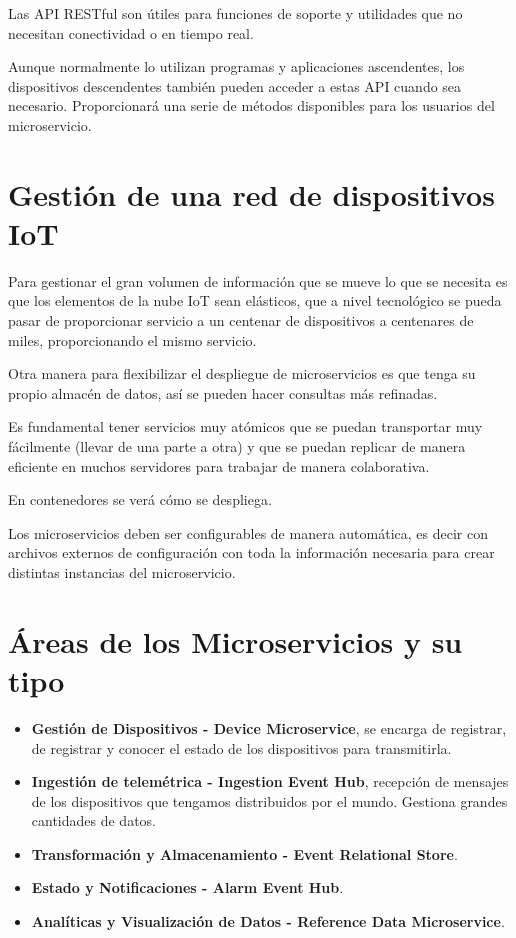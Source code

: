 \documentclass[12pt]{report} %
\begin{document}
Las API RESTful son útiles para funciones de soporte y utilidades que no necesitan conectividad o en tiempo real.

Aunque normalmente lo utilizan programas y aplicaciones ascendentes, los dispositivos descendentes también pueden acceder a estas API cuando sea necesario. Proporcionará una serie de métodos disponibles para los usuarios del microservicio.


\section{Gestión de una red de dispositivos IoT}
Para gestionar el gran volumen de información que se mueve lo que se necesita es que los elementos de la nube IoT sean elásticos, que a nivel tecnológico se pueda pasar de proporcionar servicio a un centenar de dispositivos a centenares de miles, proporcionando el mismo servicio.

Otra manera para flexibilizar el despliegue de microservicios es que tenga su propio almacén de datos, así se pueden hacer consultas más refinadas.

Es fundamental tener servicios muy atómicos que se puedan transportar muy fácilmente (llevar de una parte a otra) y que se puedan replicar de manera eficiente en muchos servidores para trabajar de manera colaborativa.

En contenedores se verá cómo se despliega.

Los microservicios deben ser configurables de manera automática, es decir con archivos externos de configuración con toda la información necesaria para crear distintas instancias del microservicio.

\section{Áreas de los Microservicios y su tipo}
\begin{itemize}
	\item \textbf{Gestión de Dispositivos - Device Microservice}, se encarga de registrar, de registrar y conocer el estado de los dispositivos para transmitirla.
	\item \textbf{Ingestión de telemétrica - Ingestion Event Hub}, recepción de mensajes de los dispositivos que tengamos distribuidos por el mundo. Gestiona grandes cantidades de datos.
	\item \textbf{Transformación y Almacenamiento - Event Relational Store}. 
	\item \textbf{Estado y Notificaciones - Alarm Event Hub}.
	\item \textbf{Analíticas y Visualización de Datos - Reference Data Microservice}. 
\end{itemize}
\end{document}

